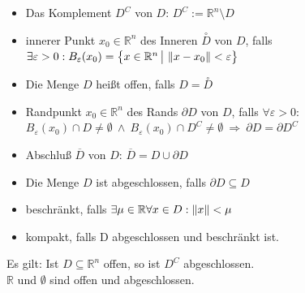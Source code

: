 \documentclass[6pt,a4paper]{scrartcl}
\newcommand{\norm}[2][\relax]{\ifx#1\relax \ensuremath{\left\Vert#2\right\Vert}\else \ensuremath{\left\Vert#2\right\Vert_{#1}}\fi}
\begin{document}
\begin{multicols*}{4}
\begin{itemize}\itemsep0pt
	\item Das Komplement $D^C$ von $D$: $D^C := \mathbb R^n \setminus D$
	\item innerer Punkt $x_0 \in \mathbb R^n$ des Inneren $\overset{\circ}{D}$ von $D$, falls \\
	$\exists \varepsilon > 0: B_\varepsilon (x_0) =
	{\ensuremath{\bigl\{ \bigl. x\in \mathbb R^n \, \bigr| \, \norm{x-x_0} < \varepsilon \bigr\}}}$
	\item Die Menge $D$ heißt offen, falls $D=\overset{\circ}{D}$
	\item Randpunkt $x_0 \in \mathbb R^n$ des Rands $\partial D$ von $D$, falls $\forall \varepsilon > 0:$ \\
		$B_\varepsilon(x_0) \cap D \ne \emptyset \ \land \ B_\varepsilon(x_0) \cap D^C \ne \emptyset \ \Rightarrow \ \partial D = \partial D^C$
	\item Abschluß $\overline D$ von $D$: $\overline{D}=D \cup \partial D$
	\item Die Menge $D$ ist abgeschlossen, falls $\partial D \subseteq D$
	\item beschränkt, falls $\exists \mu \in \mathbb R \forall x \in D: \norm{x} < \mu$
	\item kompakt, falls D abgeschlossen und beschränkt ist.
\end{itemize}
Es gilt: Ist $D \subseteq \mathbb R^n$ offen, so ist $D^C$ abgeschlossen. \\
$\mathbb R$ und $\emptyset$ sind offen und abgeschlossen.



\end{multicols*}


\end{document}
